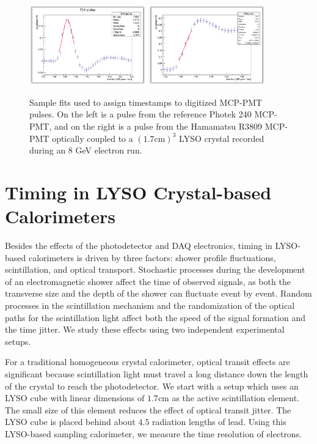 \documentclass[12pt]{article}
\begin{document}
\begin{figure}[h] \centering
\includegraphics[width=0.45\textwidth]{figs/RefPulseFit} 
\includegraphics[width=0.45\textwidth]{figs/ScintPulseFit} 
\caption{Sample fits used to assign timestamps to digitized MCP-PMT pulses. 
On the left is a pulse from the reference Photek 240 MCP-PMT, and
on the right is a pulse from the Hamamatsu R3809 MCP-PMT
optically coupled to a $(1.7\mathrm{ cm})^3$  LYSO crystal
recorded during an 8 GeV electron run.}
\label{fig:PulseFits}
\end{figure}


\section{Timing in LYSO Crystal-based Calorimeters}

Besides the effects of the photodetector and DAQ electronics, timing in
LYSO-based calorimeters is driven by three factors: shower profile fluctuations,
scintillation, and optical transport. Stochastic processes during the
development of an electromagnetic shower affect the time of observed signals, as
both the transverse size and the depth of the shower can fluctuate event by
event. Random processes in the scintillation mechanism and the randomization of
the optical paths for the scintillation light affect both the speed of the
signal formation and the time jitter. We study these effects using two
independent experimental setups. 

For a traditional homogeneous crystal calorimeter, optical transit effects are
significant because scintillation light must travel a long distance down the
length of the crystal to reach the photodetector. We start with a setup which
uses an LYSO cube with linear dimensions of $1.7\mathrm{cm}$ as the active
scintillation element. The small size of this element reduces the effect of
optical transit jitter. The LYSO cube is placed behind about $4.5$ radiation
lengths of lead. Using this LYSO-based sampling calorimeter, we measure the time
resolution of electrons.
\end{document}
